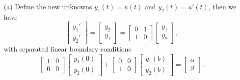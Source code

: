 \documentclass[a4paper]{book}
\makeatletter
\newenvironment{sol}[1][\solname]{\par
  \pushQED{\qed}
  \normalfont \topsep6\p@\@plus6\p@\relax
  \trivlist
  \item[\hskip\labelsep
        \itshape
    #1\@addpunct{.}]\ignorespaces
}{\popQED\endtrivlist\@endpefalse}
\providecommand{\solname}{Solution}
\numberwithin{equation}{chapter}
\theoremstyle{definition}
\makeatother
\begin{document}
  \begin{sol}
    \begin{itemize}
    \item[(a)]
    Define the new unknowns $y_1(t)=u(t)$ and $y_2(t)=u'(t)$,
    then we have
    \begin{displaymath}
      \begin{bmatrix}
        y_1' \\
        y_2'
      \end{bmatrix}
      =
      \begin{bmatrix}
        y_2 \\
        y_1
      \end{bmatrix}
      =
      \begin{bmatrix}
        0 & 1 \\
        1 & 0
      \end{bmatrix}
      \begin{bmatrix}
        y_1 \\
        y_2
      \end{bmatrix},
    \end{displaymath}
    with separated linear boundary conditions
    \begin{displaymath}
      \begin{bmatrix}
        1 & 0 \\
        0 & 0
      \end{bmatrix}
      \begin{bmatrix}
        y_1(0) \\
        y_2(0)
      \end{bmatrix}
      +
      \begin{bmatrix}
        0 & 0 \\
        1 & 0
      \end{bmatrix}
      \begin{bmatrix}
        y_1(b) \\
        y_2(b)
      \end{bmatrix}
      =
      \begin{bmatrix}
        \alpha \\
        \beta
      \end{bmatrix}.
    \end{displaymath}
  

\end{itemize}
\end{sol}
\end{document}
